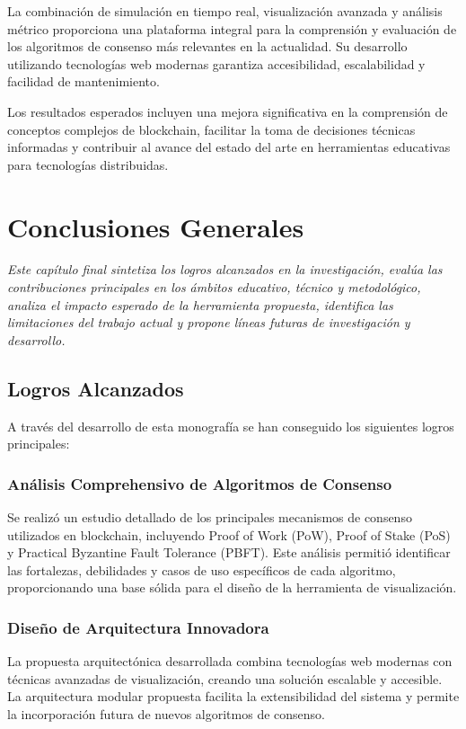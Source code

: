 \documentclass[spanish,12pt,letterpaper]{report}
\begin{document}
La combinación de simulación en tiempo real, visualización avanzada y análisis métrico proporciona una plataforma integral para la comprensión y evaluación de los algoritmos de consenso más relevantes en la actualidad. Su desarrollo utilizando tecnologías web modernas garantiza accesibilidad, escalabilidad y facilidad de mantenimiento.

Los resultados esperados incluyen una mejora significativa en la comprensión de conceptos complejos de blockchain, facilitar la toma de decisiones técnicas informadas y contribuir al avance del estado del arte en herramientas educativas para tecnologías distribuidas.

\chapter{Conclusiones Generales}

\textit{Este capítulo final sintetiza los logros alcanzados en la investigación, evalúa las contribuciones principales en los ámbitos educativo, técnico y metodológico, analiza el impacto esperado de la herramienta propuesta, identifica las limitaciones del trabajo actual y propone líneas futuras de investigación y desarrollo.}
\newpage
\section{Logros Alcanzados}

A través del desarrollo de esta monografía se han conseguido los siguientes logros principales:

\subsection{Análisis Comprehensivo de Algoritmos de Consenso}

Se realizó un estudio detallado de los principales mecanismos de consenso utilizados en blockchain, incluyendo Proof of Work (PoW), Proof of Stake (PoS) y Practical Byzantine Fault Tolerance (PBFT). Este análisis permitió identificar las fortalezas, debilidades y casos de uso específicos de cada algoritmo, proporcionando una base sólida para el diseño de la herramienta de visualización.

\subsection{Diseño de Arquitectura Innovadora}

La propuesta arquitectónica desarrollada combina tecnologías web modernas con técnicas avanzadas de visualización, creando una solución escalable y accesible. La arquitectura modular propuesta facilita la extensibilidad del sistema y permite la incorporación futura de nuevos algoritmos de consenso.
\end{document}
